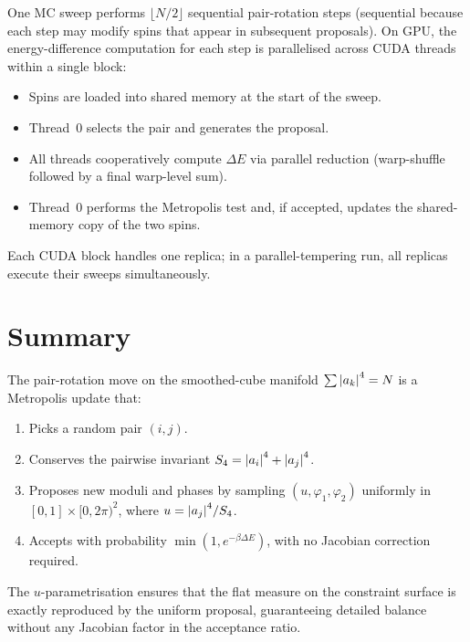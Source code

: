 \documentclass[11pt,a4paper]{article}
\newcommand{\Sfour}{S_4}
\begin{document}
One MC sweep performs $\lfloor N/2\rfloor$ sequential pair-rotation steps
(sequential because each step may modify spins that appear in subsequent
proposals).  On GPU, the energy-difference computation for each step is
parallelised across CUDA threads within a single block:
\begin{itemize}
  \item Spins are loaded into shared memory at the start of the sweep.
  \item Thread~0 selects the pair and generates the proposal.
  \item All threads cooperatively compute $\Delta E$ via parallel reduction
    (warp-shuffle followed by a final warp-level sum).
  \item Thread~0 performs the Metropolis test and, if accepted, updates the
    shared-memory copy of the two spins.
\end{itemize}
Each CUDA block handles one replica; in a parallel-tempering run, all
replicas execute their sweeps simultaneously.

\section{Summary}

The pair-rotation move on the smoothed-cube manifold $\sum\abs{a_k}^4=N$ is
a Metropolis update that:
\begin{enumerate}
  \item Picks a random pair $(i,j)$.
  \item Conserves the pairwise invariant
        $\Sfour = \abs{a_i}^4+\abs{a_j}^4$.
  \item Proposes new moduli and phases by sampling $(u,\varphi_1,\varphi_2)$
        uniformly in $[0,1]\times[0,2\pi)^2$, where $u=\abs{a_j}^4/\Sfour$.
  \item Accepts with probability $\min(1,e^{-\beta\Delta E})$,
        with no Jacobian correction required.
\end{enumerate}
The $u$-parametrisation ensures that the flat measure on the constraint
surface is exactly reproduced by the uniform proposal, guaranteeing detailed
balance without any Jacobian factor in the acceptance ratio.
\end{document}
